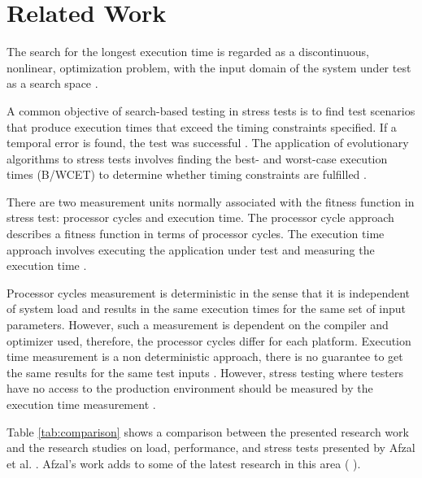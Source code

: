 \documentclass[conference]{IEEEtran}
\begin{document}


\section{Related Work}


The search for the longest execution time is regarded as a discontinuous, nonlinear, optimization problem, with the input domain of the system under test as a search space \cite{Sullivan}. 

A common objective of search-based testing in stress tests is to find test scenarios that produce execution times that exceed the timing constraints specified. If a temporal error is found, the test was successful \cite{Sullivan}. The application of evolutionary algorithms to  stress tests involves finding the best- and worst-case execution times (B/WCET) to determine whether timing constraints are fulfilled \cite{Afzal2009a}. 


There are two measurement units normally associated with the fitness function in stress test: processor cycles and execution time. The processor cycle approach describes a fitness function in terms of processor cycles. The execution time approach involves executing the application under test and measuring the execution time \cite{Afzal2009a} \cite{tracey2000search}.

Processor cycles measurement is deterministic in the sense that it is independent of system load and results in the same execution times for the same set of input parameters. However, such a measurement is dependent on the compiler and optimizer used, therefore, the processor cycles differ for each platform. Execution time measurement is a non deterministic approach, there is no guarantee to get the same results for the same test inputs \cite{Afzal2009a}.  However, stress testing where testers have no access to the production environment should be measured by the execution time measurement \cite{Molyneaux2009} \cite{Afzal2009a}.

Table \ref{tab:comparison}  shows a comparison between the presented research work and the research studies on load, performance, and stress tests presented by Afzal et al. \cite{Afzal2009}. Afzal's work adds to some of the latest research in this area (\cite{Garousi2006} \cite{Garousi2010} \cite{DiAlesio2013} \cite{DiAlesio2014} \cite{Alesio2015}). 
\end{document}
